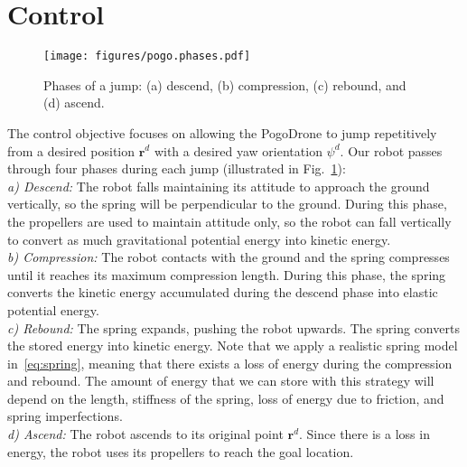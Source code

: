 \documentclass[letterpaper,10pt,conference]{ieeeconf}
\begin{document}
\section{Control}
\label{sec:Control}
\begin{figure}[t]
    \texttt{[image: figures/pogo.phases.pdf]}
    \caption{Phases of a jump: (a) descend, (b) compression, (c) rebound, and (d) ascend.}
    \label{fig:ControlPhases}
\end{figure}

\noindent
The control objective focuses on allowing the PogoDrone to jump repetitively from a desired position $\boldsymbol{r}^d$ with a desired yaw orientation $\psi^d$. Our robot passes through four phases during each jump (illustrated in Fig.~\ref{fig:ControlPhases}):\\
%
\textit{a) Descend: } The robot falls maintaining its attitude to approach the ground vertically, so the spring will be perpendicular to the ground. During this phase, the propellers are used to maintain attitude only, so the robot can fall vertically to convert as much gravitational potential energy into kinetic energy.\\
%
\textit{b) Compression: } The robot contacts with the ground and the spring compresses until it reaches its maximum compression length. During this phase, the spring converts the kinetic energy accumulated during the descend phase into elastic potential energy.\\
%
\textit{c) Rebound: } The spring expands, pushing the robot upwards. The spring converts the stored energy into kinetic energy. Note that we apply a realistic spring model in~\eqref{eq:spring}, meaning that there exists a loss of energy during the compression and rebound. The amount of energy that we can store with this strategy will depend on the length, stiffness of the spring, loss of energy due to friction, and spring imperfections.\\
%
\textit{d) Ascend: } The robot ascends to its original point $\boldsymbol{r}^d$. Since there is a loss in energy, the robot uses its propellers to reach the goal location.
\end{document}
